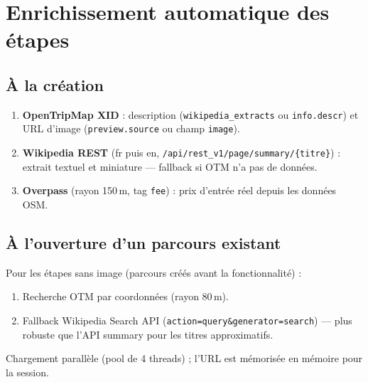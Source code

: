 \documentclass[a4paper,11pt]{article}
\begin{document}
\section{Enrichissement automatique des étapes}

\subsection{À la création}
\begin{enumerate}[leftmargin=1.5em]
  \item \textbf{OpenTripMap XID} : description (\texttt{wikipedia\_extracts}
        ou \texttt{info.descr}) et URL d'image (\texttt{preview.source}
        ou champ \texttt{image}).
  \item \textbf{Wikipedia REST} (fr puis en,
        \texttt{/api/rest\_v1/page/summary/\{titre\}}) : extrait textuel
        et miniature — fallback si OTM n'a pas de données.
  \item \textbf{Overpass} (rayon 150\,m, tag \texttt{fee}) : prix d'entrée
        réel depuis les données OSM.
\end{enumerate}

\subsection{À l'ouverture d'un parcours existant}
Pour les étapes sans image (parcours créés avant la fonctionnalité) :
\begin{enumerate}[leftmargin=1.5em]
  \item Recherche OTM par coordonnées (rayon 80\,m).
  \item Fallback Wikipedia Search API
        (\texttt{action=query\&generator=search}) — plus robuste que
        l'API summary pour les titres approximatifs.
\end{enumerate}
Chargement parallèle (pool de 4 threads) ; l'URL est mémorisée en mémoire
pour la session.
\end{document}
